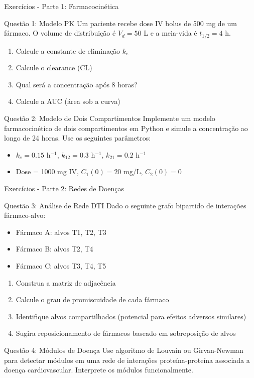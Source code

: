 \begin{frame}{Exercícios - Parte 1: Farmacocinética}
\begin{block}{Questão 1: Modelo PK}
Um paciente recebe dose IV bolus de 500 mg de um fármaco. O volume de distribuição é $V_d = 50$ L e a meia-vida é $t_{1/2} = 4$ h.

\begin{enumerate}
    \item Calcule a constante de eliminação $k_e$
    \item Calcule o clearance (CL)
    \item Qual será a concentração após 8 horas?
    \item Calcule a AUC (área sob a curva)
\end{enumerate}
\end{block}

\begin{block}{Questão 2: Modelo de Dois Compartimentos}
Implemente um modelo farmacocinético de dois compartimentos em Python e simule a concentração ao longo de 24 horas. Use os seguintes parâmetros:
\begin{itemize}
    \item $k_e = 0.15$ h$^{-1}$, $k_{12} = 0.3$ h$^{-1}$, $k_{21} = 0.2$ h$^{-1}$
    \item Dose = 1000 mg IV, $C_1(0) = 20$ mg/L, $C_2(0) = 0$
\end{itemize}
\end{block}
\end{frame}

\begin{frame}{Exercícios - Parte 2: Redes de Doenças}
\begin{block}{Questão 3: Análise de Rede DTI}
Dado o seguinte grafo bipartido de interações fármaco-alvo:
\begin{itemize}
    \item Fármaco A: alvos T1, T2, T3
    \item Fármaco B: alvos T2, T4
    \item Fármaco C: alvos T3, T4, T5
\end{itemize}

\begin{enumerate}
    \item Construa a matriz de adjacência
    \item Calcule o grau de promiscuidade de cada fármaco
    \item Identifique alvos compartilhados (potencial para efeitos adversos similares)
    \item Sugira reposicionamento de fármacos baseado em sobreposição de alvos
\end{enumerate}
\end{block}

\begin{block}{Questão 4: Módulos de Doença}
Use algoritmo de Louvain ou Girvan-Newman para detectar módulos em uma rede de interações proteína-proteína associada a doença cardiovascular. Interprete os módulos funcionalmente.
\end{block}
\end{frame}

